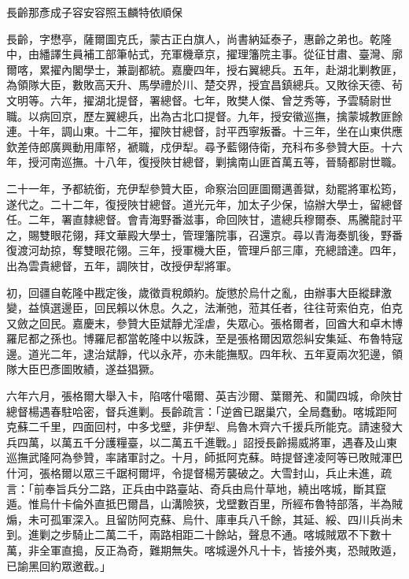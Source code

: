 
\begin{pinyinscope}
長齡那彥成子容安容照玉麟特依順保

長齡，字懋亭，薩爾圖克氏，蒙古正白旗人，尚書納延泰子，惠齡之弟也。乾隆中，由繙譯生員補工部筆帖式，充軍機章京，擢理籓院主事。從征甘肅、臺灣、廓爾喀，累擢內閣學士，兼副都統。嘉慶四年，授右翼總兵。五年，赴湖北剿教匪，為領隊大臣，數敗高天升、馬學禮於川、楚交界，授宜昌鎮總兵。又敗徐天德、茍文明等。六年，擢湖北提督，署總督。七年，敗樊人傑、曾芝秀等，予雲騎尉世職。以病回京，歷左翼總兵，出為古北口提督。九年，授安徽巡撫，擒蒙城教匪餘連。十年，調山東。十二年，擢陜甘總督，討平西寧叛番。十三年，坐在山東供應欽差侍郎廣興動用庫帑，褫職，戍伊犁。尋予藍翎侍衛，充科布多參贊大臣。十六年，授河南巡撫。十八年，復授陜甘總督，剿擒南山匪首萬五等，晉騎都尉世職。

二十一年，予都統銜，充伊犁參贊大臣，命察治回匪圖爾邁善獄，劾罷將軍松筠，遂代之。二十二年，復授陜甘總督。道光元年，加太子少保，協辦大學士，留總督任。二年，署直隸總督。會青海野番滋事，命回陜甘，遣總兵穆爾泰、馬騰龍討平之，賜雙眼花翎，拜文華殿大學士，管理籓院事，召還京。尋以青海奏凱後，野番復渡河劫掠，奪雙眼花翎。三年，授軍機大臣，管理戶部三庫，充總諳達。四年，出為雲貴總督，五年，調陜甘，改授伊犁將軍。

初，回疆自乾隆中戡定後，歲徵貢稅頗約。旋懲於烏什之亂，由辦事大臣縱肆激變，益慎選邊臣，回民賴以休息。久之，法漸弛，蒞其任者，往往苛索伯克，伯克又斂之回民。嘉慶末，參贊大臣斌靜尤淫虐，失眾心。張格爾者，回酋大和卓木博羅尼都之孫也。博羅尼都當乾隆中以叛誅，至是張格爾因眾怨糾安集延、布魯特寇邊。道光二年，逮治斌靜，代以永芹，亦未能撫馭。四年秋、五年夏兩次犯邊，領隊大臣巴彥圖敗績，遂益猖獗。

六年六月，張格爾大舉入卡，陷喀什噶爾、英吉沙爾、葉爾羌、和闐四城，命陜甘總督楊遇春駐哈密，督兵進剿。長齡疏言：「逆酋已踞巢穴，全局蠢動。喀城距阿克蘇二千里，四面回村，中多戈壁，非伊犁、烏魯木齊六千援兵所能克。請速發大兵四萬，以萬五千分護糧臺，以二萬五千進戰。」詔授長齡揚威將軍，遇春及山東巡撫武隆阿為參贊，率諸軍討之。十月，師抵阿克蘇。時提督達凌阿等已敗賊渾巴什河，張格爾以眾三千踞柯爾坪，令提督楊芳襲破之。大雪封山，兵止未進，疏言：「前奉旨兵分二路，正兵由中路臺站、奇兵由烏什草地，繞出喀城，斷其竄遁。惟烏什卡倫外直抵巴爾昌，山溝險狹，戈壁數百里，所經布魯特部落，半為賊煽，未可孤軍深入。且留防阿克蘇、烏什、庫車兵八千餘，其延、綏、四川兵尚未到。進剿之步騎止二萬二千，兩路相距二十餘站，聲息不通。喀城賊眾不下數十萬，非全軍直搗，反正為奇，難期無失。喀城邊外凡十卡，皆接外夷，恐賊敗遁，已諭黑回約眾邀截。」


\end{pinyinscope}
